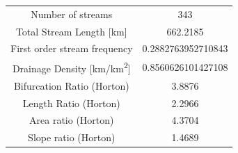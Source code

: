 \documentclass[11pt,]{article}
\begin{document}
\begin{longtable}[]{@{}cc@{}}
\begin{minipage}[t]{0.65\columnwidth}
Number of streams\strut
\end{minipage} & \begin{minipage}[t]{0.29\columnwidth}\centering\strut
343\strut
\end{minipage}\tabularnewline
\begin{minipage}[t]{0.65\columnwidth}\centering\strut
Total Stream Length {[}km{]}\strut
\end{minipage} & \begin{minipage}[t]{0.29\columnwidth}\centering\strut
662.2185\strut
\end{minipage}\tabularnewline
\begin{minipage}[t]{0.65\columnwidth}\centering\strut
First order stream frequency\strut
\end{minipage} & \begin{minipage}[t]{0.29\columnwidth}\centering\strut
0.2882763952710843\strut
\end{minipage}\tabularnewline
\begin{minipage}[t]{0.65\columnwidth}\centering\strut
Drainage Density {[}km/km\textsuperscript{2}{]}\strut
\end{minipage} & \begin{minipage}[t]{0.29\columnwidth}\centering\strut
0.8560626101427108\strut
\end{minipage}\tabularnewline
\begin{minipage}[t]{0.65\columnwidth}\centering\strut
Bifurcation Ratio (Horton)\strut
\end{minipage} & \begin{minipage}[t]{0.29\columnwidth}\centering\strut
3.8876\strut
\end{minipage}\tabularnewline
\begin{minipage}[t]{0.65\columnwidth}\centering\strut
Length Ratio (Horton)\strut
\end{minipage} & \begin{minipage}[t]{0.29\columnwidth}\centering\strut
2.2966\strut
\end{minipage}\tabularnewline
\begin{minipage}[t]{0.65\columnwidth}\centering\strut
Area ratio (Horton)\strut
\end{minipage} & \begin{minipage}[t]{0.29\columnwidth}\centering\strut
4.3704\strut
\end{minipage}\tabularnewline
\begin{minipage}[t]{0.65\columnwidth}\centering\strut
Slope ratio (Horton)\strut
\end{minipage} & \begin{minipage}[t]{0.29\columnwidth}\centering\strut
1.4689\strut
\end{minipage}\tabularnewline
\bottomrule
\end{longtable}
\end{document}
